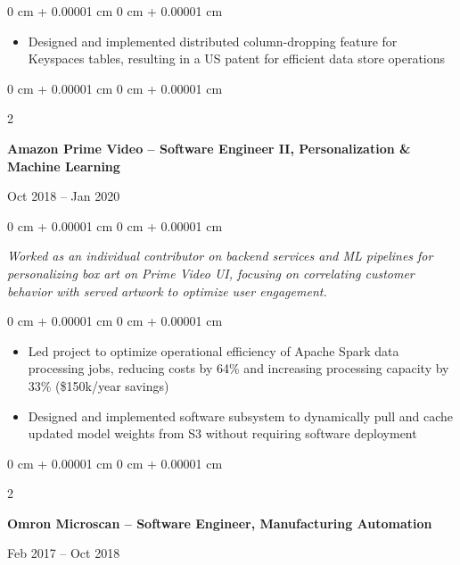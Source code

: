 \documentclass[10pt, letterpaper]{article}
\newenvironment{highlights}{
    \begin{itemize}[
        topsep=0.10 cm,
        parsep=0.10 cm,
        partopsep=0pt,
        itemsep=0pt,
        leftmargin=0 cm + 10pt
    ]
}{
    \end{itemize}
} %
\newenvironment{onecolentry}{
    \begin{adjustwidth}{
        0 cm + 0.00001 cm
    }{
        0 cm + 0.00001 cm
    }
}{
    \end{adjustwidth}
} %
\newenvironment{twocolentry}[2][]{
    \onecolentry
    \def\secondColumn{#2}
    \setcolumnwidth{\fill, 4.5 cm}
    \begin{paracol}{2}
}{
    \switchcolumn \raggedleft \secondColumn
    \end{paracol}
    \endonecolentry
} %
\begin{document}
        \vspace{0.05 cm}
        \begin{onecolentry}
            \begin{highlights}
                \item Designed and implemented distributed column-dropping feature for Keyspaces tables, resulting in a US patent for efficient data store operations
            \end{highlights}
        \end{onecolentry}

        \vspace{0.2 cm}

        \begin{twocolentry}{
            Oct 2018 – Jan 2020
        }
            \textbf{Amazon Prime Video -- Software Engineer II, Personalization \& Machine Learning}
        \end{twocolentry}

        \vspace{0.05 cm}
        \begin{onecolentry}
            \textit{Worked as an individual contributor on backend services and ML pipelines for personalizing box art on Prime Video UI, focusing on correlating customer behavior with served artwork to optimize user engagement.}
        \end{onecolentry}

        \vspace{0.05 cm}
        \begin{onecolentry}
            \begin{highlights}
                \item Led project to optimize operational efficiency of Apache Spark data processing jobs, reducing costs by 64\% and increasing processing capacity by 33\% (\$150k/year savings)
                \item Designed and implemented software subsystem to dynamically pull and cache updated model weights from S3 without requiring software deployment
            \end{highlights}
        \end{onecolentry}

        \vspace{0.2 cm}

        \begin{twocolentry}{
            Feb 2017 – Oct 2018
        }
            \textbf{Omron Microscan – Software Engineer, Manufacturing Automation}
        \end{twocolentry}
\end{document}
